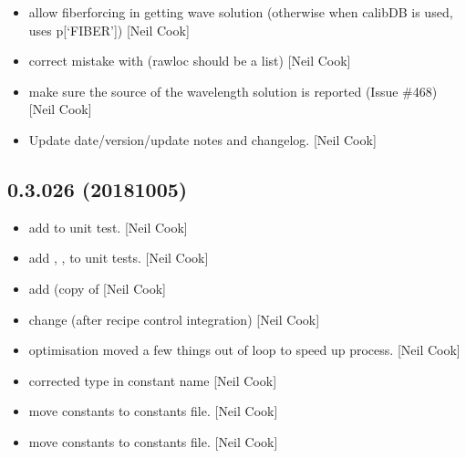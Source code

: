 \documentclass[a4paper,10pt,english]{report}
\begin{document}
\begin{itemize}
\item {} 
 \sphinxhyphen{} allow fiber\sphinxhyphen{}forcing in getting wave solution
(otherwise when calibDB is used, uses p{[}‘FIBER’{]}) {[}Neil Cook{]}

\item {} 
 \sphinxhyphen{} correct mistake with  (rawloc
should be a list) {[}Neil Cook{]}

\item {} 
 \sphinxhyphen{} make sure the source of the wavelength solution is
reported (Issue \#468) {[}Neil Cook{]}

\item {} 
Update date/version/update notes and changelog. {[}Neil Cook{]}

\end{itemize}


\subsection{0.3.026 (2018\sphinxhyphen{}10\sphinxhyphen{}05)}
\label{\detokenize{misc/changelog:id324}}\begin{itemize}
\item {} 
 \sphinxhyphen{} add  to unit test. {[}Neil Cook{]}

\item {} 
 \sphinxhyphen{} add , ,
 to unit tests. {[}Neil Cook{]}

\item {} 
 \sphinxhyphen{} add  (copy of 
{[}Neil Cook{]}

\item {} 
 \sphinxhyphen{} change  (after recipe control
integration) {[}Neil Cook{]}

\item {} 
 \sphinxhyphen{} optimisation \sphinxhyphen{} moved a few things out of loop to
speed up process. {[}Neil Cook{]}

\item {} 
 \sphinxhyphen{} corrected type in constant name
 {[}Neil Cook{]}

\item {} 
 \sphinxhyphen{} move  constants to
constants file. {[}Neil Cook{]}

\item {} 
 \sphinxhyphen{} move constants to constants file. {[}Neil Cook{]}

\end{itemize}
\end{document}

